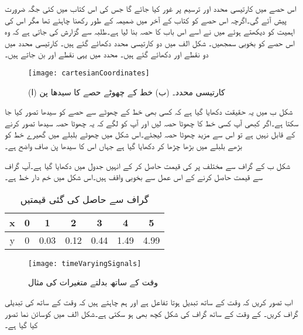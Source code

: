 \label{حصہ_کارتیسی_محدد_اور_ترسیم}
اس حصے میں کارتیسی محدد  اور ترسیم پر غور کیا جائے گا جس کی اس کتاب میں کئی جگہ ضرورت پیش آئے گی۔اگرچہ اس حصے کو کتاب کے آخر میں ضمیمہ کے طور رکھنا چاہئے تھا مگر اس کی اہمیت کو دیکھتے ہوئے میں نے اسے اس باب کا حصہ بنا لیا ہے۔طلبہ سے گزارش کی جاتی ہے کہ وہ اس حصے کو بخوبی سمجھیں۔
  
شکل  الف میں دو کارتیسی محدد  دکھائے گئے ہیں۔  کارتیسی محدد  میں دو نقطے  اور  دکھائے گئے ہیں۔ محدد میں یہی نقطے  اور  بن جاتے ہیں۔
\begin{figure}
\centering
\texttt{[image: cartesianCoordinates]}
\caption{ (ا) کارتیسی محدد۔  (ب) خط کے چھوٹے حصے کا سیدھا پن}
\label{شکل_کارتیسی_محدد}
\end{figure}
 
شکل  ب میں یہ حقیقت دکھایا گیا ہے کہ کسی بھی خط کے چھوٹے سے حصے کو سیدھا تصور کیا جا سکتا ہے۔اگر کبھی آپ کسی خط کا چھوٹا حصہ لیں اور آپ کو لگے کہ یہ چھوٹا حصہ سیدھا تصور کرنے کے قابل نہیں ہے تو اس سے مزید چھوٹا حصہ لیجئے۔اس شکل میں چھوٹے بلبلے میں گھیرے خط کو بڑھے بلبلے میں بڑھا چڑھا کر دکھایا گیا ہے جہاں اس کا سیدھا پن صاف واضح ہے۔

شکل  ب کے گراف سے مختلف    پر  کی قیمت حاصل کر کے انہیں جدول   میں دکھایا گیا ہے۔آپ گراف سے قیمت حاصل کرنے کے اس عمل سے بخوبی واقف ہیں۔اس شکل میں   خم دار خط ہے۔
\begin{table} [h]
\caption{گراف سے حاصل کی گئی قیمتیں}
\label{جدول_گراف_سے_حاصل_کی_گئی_قیمتیں}
\centering
\begin{LTR}
\begin{tabular}{c|c c c c c c}
x & 0 & 1 & 2 & 3 & 4 & 5 \\
\midrule
y & 0 & 0.03 & 0.12 & 0.44 & 1.49 & 4.99 \\
\end{tabular}
\end{LTR}

\end{table}


\begin{figure}
\centering
\texttt{[image: timeVaryingSignals]}
\caption{ وقت کے ساتھ بدلتے متغیرات کی مثال}
\label{شکل_وقت_کے_ساتھ_تبدیل_ہوتے_متغیرات}
\end{figure}
اب تصور کریں کہ  وقت کے ساتھ تبدیل ہوتا تفاعل ہے اور ہم چاہتے ہیں کہ وقت کے ساتھ   کی تبدیلی گراف کریں۔  کے وقت کے ساتھ گراف کی شکل کچھ بھی ہو سکتی ہے۔شکل  الف میں  کوسائن نما تصور کیا گیا ہے۔


